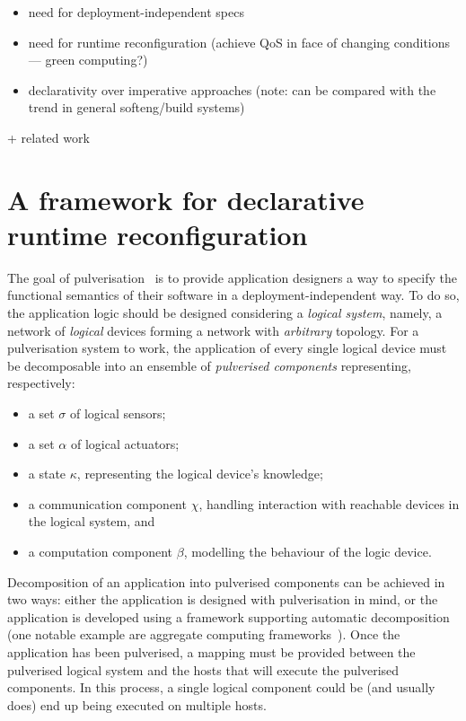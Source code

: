 \documentclass[conference]{IEEEtran}
\begin{document}
\begin{itemize}
    \item need for deployment-independent specs
    \item need for runtime reconfiguration (achieve QoS in face of changing conditions --- green computing?)
    \item declarativity over imperative approaches (note: can be compared with the trend in general softeng/build systems)
\end{itemize}

+ related work

\section{A framework for declarative runtime reconfiguration}\label{sec:contribution}

The goal of pulverisation~\cite{FI2020-pulverization}
is to provide application designers a way to specify the functional semantics of their software in a deployment-independent way.
%
To do so,
the application logic should be designed considering a \emph{logical system},
namely, a network of \emph{logical} devices forming a network with \emph{arbitrary} topology.
%
For a pulverisation system to work,
the application of every single logical device must be decomposable into an ensemble of \emph{pulverised components}
representing, respectively:
\begin{itemize}
    \item a set $\sigma$ of logical sensors;
    \item a set $\alpha$ of logical actuators;
    \item a state $\kappa$, representing the logical device's knowledge;
    \item a communication component $\chi$,
    handling interaction with reachable devices in the logical system, and
    \item a computation component $\beta$, modelling the behaviour of the logic device.
\end{itemize}
%
Decomposition of an application into pulverised components can be achieved in two ways:
either the application is designed with pulverisation in mind,
or the application is developed using a framework supporting automatic decomposition
(one notable example are aggregate computing frameworks~\cite{BealIEEEComputer2015}).
%
Once the application has been pulverised,
a mapping must be provided between the pulverised logical system and the hosts that will execute the pulverised components.
%
In this process,
a single logical component could be (and usually does) end up being executed on multiple hosts.
\end{document}
